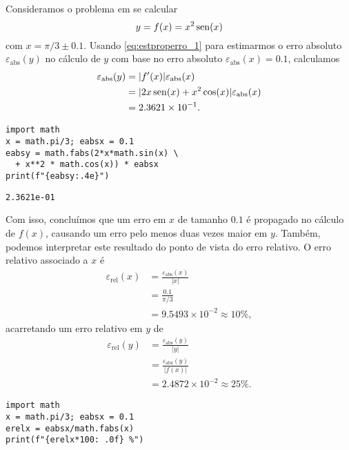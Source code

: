 \begin{ex}\label{ex:properro_1}
  Consideramos o problema em se calcular
  \begin{equation}
    y = f(x) = x^2\operatorname{sen}(x)
  \end{equation}
  com $x=\pi/3 \pm 0.1$. Usando \eqref{eq:estproperro_1} para estimarmos o erro absoluto $\varepsilon_{\text{abs}}(y)$ no cálculo de $y$ com base no erro absoluto $\varepsilon_{\text{abs}}(x)=0.1$, calculamos
  \begin{align}
    \varepsilon_{\text{abs}}(y) &= |f'(x)|\varepsilon_{\text{abs}}(x)\\
             &= |2x\operatorname{sen}(x) + x^2\cos(x)|\varepsilon_{\text{abs}}(x)\\
             &= 2.3621\times 10^{-1}.
  \end{align}

  
\begin{lstlisting}
import math
x = math.pi/3; eabsx = 0.1
eabsy = math.fabs(2*x*math.sin(x) \
  + x**2 * math.cos(x)) * eabsx
print(f"{eabsy:.4e}")
\end{lstlisting}

\begin{verbatim}
2.3621e-01
\end{verbatim}
  
  Com isso, concluímos que um erro em $x$ de tamanho $0.1$ é propagado no cálculo de $f(x)$, causando um erro pelo menos duas vezes maior em $y$. Também, podemos interpretar este resultado do ponto de vista do erro relativo. O erro relativo associado a $x$ é
  \begin{align}
    \varepsilon_{\text{rel}}(x) &= \frac{\varepsilon_{\text{abs}}(x)}{|x|}\\
                                &= \frac{0.1}{\pi/3}\\
                                &= 9.5493\times 10^{-2} \approx 10\%,
  \end{align}
  acarretando um erro relativo em $y$ de
  \begin{align}
    \varepsilon_{\text{rel}}(y) &= \frac{\varepsilon_{\text{abs}}(y)}{|y|}\\
                                &= \frac{\varepsilon_{\text{abs}}(y)}{|f(x)|} \\
                                &= 2.4872\times 10^{-2} \approx 25\%.
  \end{align}

  
\begin{lstlisting}
import math
x = math.pi/3; eabsx = 0.1
erelx = eabsx/math.fabs(x)
print(f"{erelx*100: .0f} %")
\end{lstlisting}


\end{ex}
